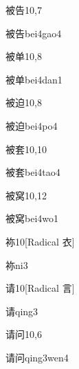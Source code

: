 \begin{entry}{被告}{10,7}
  \begin{phonetics}{被告}{bei4gao4}
  \end{phonetics}
\end{entry}

\begin{entry}{被单}{10,8}
  \begin{phonetics}{被单}{bei4dan1}
  \end{phonetics}
\end{entry}

\begin{entry}{被迫}{10,8}
  \begin{phonetics}{被迫}{bei4po4}
  \end{phonetics}
\end{entry}

\begin{entry}{被套}{10,10}
  \begin{phonetics}{被套}{bei4tao4}
  \end{phonetics}
\end{entry}

\begin{entry}{被窝}{10,12}
  \begin{phonetics}{被窝}{bei4wo1}
  \end{phonetics}
\end{entry}

\begin{entry}{袮}{10}[Radical 衣]
  \begin{phonetics}{袮}{ni3}
  \end{phonetics}
\end{entry}

\begin{entry}{请}{10}[Radical 言]
  \begin{phonetics}{请}{qing3}
  \end{phonetics}
\end{entry}

\begin{entry}{请问}{10,6}
  \begin{phonetics}{请问}{qing3wen4}
  \end{phonetics}
\end{entry}

